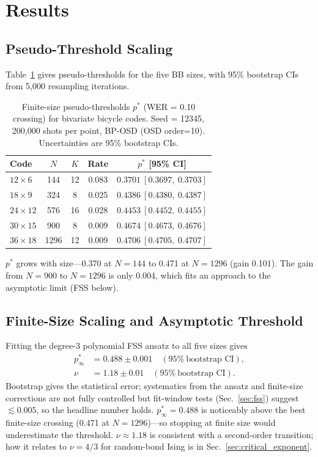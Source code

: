 \documentclass[twocolumn,10pt]{article}
\begin{document}
\section{Results}

\subsection{Pseudo-Threshold Scaling}

Table~\ref{tab:thresholds} gives pseudo-thresholds for the five BB sizes, with 95\%
bootstrap CIs from 5{,}000 resampling iterations.

\begin{table}[h]
\centering
\caption{Finite-size pseudo-thresholds $p^*$ (WER = 0.10 crossing) for bivariate bicycle codes.
Seed = 12345, 200{,}000 shots per point, BP-OSD (OSD order=10).
Uncertainties are 95\% bootstrap CIs.}
\label{tab:thresholds}
\begin{tabular}{lcccc}
\toprule
Code & $N$ & $K$ & Rate & $p^*$ [95\% CI] \\
\midrule
$12{\times}6$  & 144  & 12 & 0.083 & $0.3701\ [0.3697,\ 0.3703]$ \\
$18{\times}9$  & 324  &  8 & 0.025 & $0.4386\ [0.4380,\ 0.4387]$ \\
$24{\times}12$ & 576  & 16 & 0.028 & $0.4453\ [0.4452,\ 0.4455]$ \\
$30{\times}15$ & 900  &  8 & 0.009 & $0.4674\ [0.4673,\ 0.4676]$ \\
$36{\times}18$ & 1296 & 12 & 0.009 & $0.4706\ [0.4705,\ 0.4707]$ \\
\bottomrule
\end{tabular}
\end{table}

$p^*$ grows with size---0.370 at $N=144$ to 0.471 at $N=1296$ (gain 0.101).
The gain from $N=900$ to $N=1296$ is only 0.004, which fits an approach to the asymptotic
limit (FSS below).

\subsection{Finite-Size Scaling and Asymptotic Threshold}\label{sec:fss_results}

Fitting the degree-3 polynomial FSS ansatz to all five sizes gives
\begin{align}
    p^*_\infty &= 0.488 \pm 0.001 \quad (95\%\ \text{bootstrap CI}), \\
    \nu         &= 1.18  \pm 0.01  \quad (95\%\ \text{bootstrap CI}).
\end{align}
Bootstrap gives the statistical error; systematics from the ansatz and finite-size
corrections are not fully controlled but fit-window tests (Sec.~\ref{sec:fss}) suggest
$\lesssim 0.005$, so the headline number holds.
$p^*_\infty = 0.488$ is noticeably above the best finite-size crossing (0.471 at $N=1296$)---so
stopping at finite size would underestimate the threshold.
$\nu \approx 1.18$ is consistent with a second-order transition; how it relates to
$\nu = 4/3$ for random-bond Ising \cite{dennis2002topological} is in
Sec.~\ref{sec:critical_exponent}.
\end{document}
